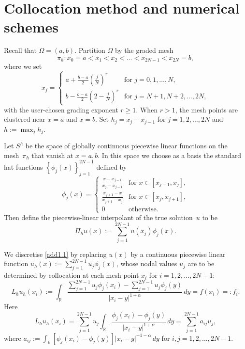 \documentclass[smallextended]{svjour3}       %
\begin{document}
	

	
	
	\section{Collocation method and numerical schemes}\label{sec:method}
Recall that $\Omega=(a,b)$.  Partition $\Omega$ by the graded mesh 
	\begin{equation*}
		\pi_h: x_{0}=a<x_{1}<x_{2}<\dots<x_{2N-1}<x_{2N}=b,
	\end{equation*}
where we set
\begin{equation}\label{add2.1}
x_j=
\begin{cases}	
	a+\frac{b-a}{2}\left( \frac{j}{N} \right) ^r &\text{for } j=0,1,\dots ,N,\\	
	b-\frac{b-a}{2}\left( 2-\frac{j}{N} \right) ^r &\text{for } j=N+1,N+2,\dots ,2N,
		\end{cases}
\end{equation}
with the user-chosen grading exponent $r\geq1$. When $r>1$, the mesh points are clustered near $x=a$ and $x=b$.
Set $h_j=x_j-x_{j-1}$ for $j=1,2,\dots,2N$ and $h:=\max_j h_j$.

Let $S^{h}$ be the space of globally continuous piecewise linear functions on the mesh~$\pi_h$ that vanish at $x=a,b$.
In this space we choose as a basis  the standard hat functions $\left\{\phi_{j }(x) \right\}_{j=1}^{2N-1}$ defined by
\[
\phi_j(x)= \begin{cases}
			\displaystyle\frac{x-x_{j-1}}{x_j-x_{j-1}} &\text{for }  x \in \left[x_{j-1}, x_{j}\right],\\
			\displaystyle\frac{x_{j+1}-x}{x_{j+1}-x_j} &\text{for } x \in \left[x_{j}, x_{j+1}\right],\\
			\displaystyle 0 &\text{otherwise}.
		\end{cases}
\]
Then define the piecewise-linear interpolant of the true solution~$u$ to be 	
\[
\Pi_{h} u(x) :=\sum_{j=1}^{2N-1} u \left(x_{j}\right) \phi_{j}(x).
\]

We discretise  \eqref{add1.1} by replacing $u(x)$ by a continuous piecewise linear function 
$u_h(x) := \sum_{j=1}^{2N-1} u_j \phi_{j}(x)$, whose nodal values $u_j$ are to be determined by collocation at each mesh point $x_i$ for $i=1,2,\dots,2N-1$: 
\begin{equation}\label{coll1}
L_h u_h(x_i) := \int_{\mathbb{R}} \frac{\sum_{j=1}^{2N-1} u_j\phi_j\left(x_{i}\right)
	-\sum_{j=1}^{2N-1} u_j\phi_{j}(y)}{\left|x_{i}-y\right|^{1+\alpha}} \,dy
	= f(x_i) =: f_i.
\end{equation}
Here
\begin{equation}\label{coll2}
L_h u_h(x_i)  = \sum_{j=1}^{2N-1} u_j \int_{\mathbb{R}}	\frac{\phi_{j}\left(x_{i}\right)-\phi_{j}(y)}
			{\left|x_{i}-y\right|^{1+\alpha}} \,dy
	=\sum_{j=1}^{2N-1} a_{i j}u_j,
\end{equation}
where   $a_{ij}:=\int_{\mathbb{R}} \left[\phi_{j}\left(x_{i}\right)-\phi_{j}(y)\right]
	\left|x_{i}-y\right|^{-1-\alpha} \,dy$ for $i,j=1,2,\dots,2N-1$.
\end{document}

